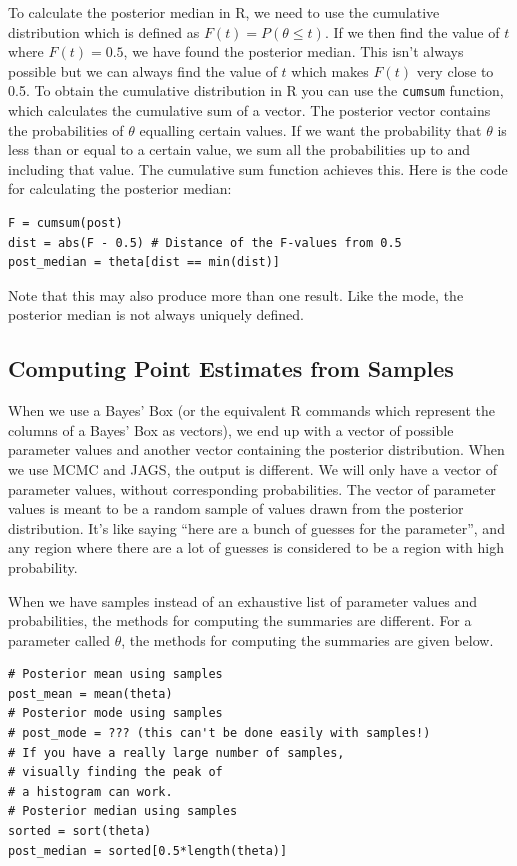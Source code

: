 To calculate the posterior median in R, we need to use the cumulative distribution
which is defined as $F(t) = P(\theta \leq t)$. If we then find the value of $t$
where $F(t) = 0.5$, we have found the posterior median. This isn't always
possible but we can always find the value of $t$ which makes $F(t)$ very close to
0.5.
To obtain the cumulative distribution
in R you can use the {\tt cumsum} function, which calculates the cumulative sum
of a vector. The posterior vector contains the probabilities of $\theta$ equalling
certain values. If we want the probability that $\theta$ is less than or
equal to a certain value, we sum all the probabilities up to and including that value. The
cumulative sum function achieves this. Here is the code for calculating the
posterior median:
\begin{verbatim}
F = cumsum(post)
dist = abs(F - 0.5) # Distance of the F-values from 0.5
post_median = theta[dist == min(dist)]
\end{verbatim}
Note that this may also produce more than one result. Like the mode, the
posterior median is not always uniquely defined.

\subsection{Computing Point Estimates from Samples}
When we use a Bayes' Box (or the equivalent R commands which represent the
columns of a Bayes' Box as vectors), we end up with a vector of possible parameter
values and another vector containing the posterior distribution.
When we use MCMC and JAGS, the output is different.
We will only have a vector of parameter
values, without corresponding probabilities. The vector of parameter values is
meant to be a random sample of values drawn from the posterior distribution.
It's like saying ``here are a bunch of guesses for the parameter'', and any
region where there are a lot of guesses is considered to be a region with high
probability.

When we have samples instead of an exhaustive list of parameter values and
probabilities, the methods for computing the summaries are different. For a
parameter called $\theta$, the methods for computing the summaries are given
below.

\begin{verbatim}
# Posterior mean using samples
post_mean = mean(theta)
# Posterior mode using samples
# post_mode = ??? (this can't be done easily with samples!)
# If you have a really large number of samples,
# visually finding the peak of
# a histogram can work.
# Posterior median using samples
sorted = sort(theta)
post_median = sorted[0.5*length(theta)]
\end{verbatim}

